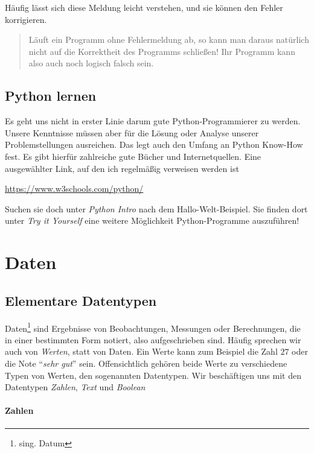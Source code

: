 \documentclass[
  oneside]{book}
\begin{document}
Häufig lässt sich diese Meldung leicht verstehen, und sie können den Fehler korrigieren.

\begin{quote}
Läuft ein Programm ohne Fehlermeldung ab, so kann man daraus natürlich nicht auf die Korrektheit des Programms schließen! Ihr Programm kann also auch noch logisch falsch sein.
\end{quote}

\hypertarget{python-lernen}{%
\section{Python lernen}\label{python-lernen}}

Es geht uns nicht in erster Linie darum gute Python-Programmierer zu werden. Unsere Kenntnisse müssen aber für die Lösung oder Analyse unserer Problemstellungen ausreichen. Das legt auch den Umfang an Python Know-How fest. Es gibt hierfür zahlreiche gute Bücher und Internetquellen. Eine ausgewählter Link, auf den ich regelmäßig verweisen werden ist

\url{https://www.w3schools.com/python/}

Suchen sie doch unter \emph{Python Intro} nach dem Hallo-Welt-Beispiel. Sie finden dort unter \emph{Try it Yourself} eine weitere Möglichkeit Python-Programme auszuführen!

\hypertarget{daten}{%
\chapter{Daten}\label{daten}}

\hypertarget{elementare-datentypen}{%
\section{Elementare Datentypen}\label{elementare-datentypen}}

Daten\footnote{sing. Datum} sind Ergebnisse von Beobachtungen, Messungen oder Berechnungen, die in einer bestimmten Form notiert, also aufgeschrieben sind. Häufig sprechen wir auch von \emph{Werten}, statt von Daten. Ein Werte kann zum Beispiel die Zahl \(27\) oder die Note ``\emph{sehr gut}'' sein. Offensichtlich gehören beide Werte zu verschiedene Typen von Werten, den sogenannten Datentypen. Wir beschäftigen uns mit den Datentypen \emph{Zahlen}, \emph{Text} und \emph{Boolean}

\hypertarget{zahlen}{%
\subsubsection*{\texorpdfstring{\textbf{Zahlen}}{Zahlen}}\label{zahlen}}
\end{document}
